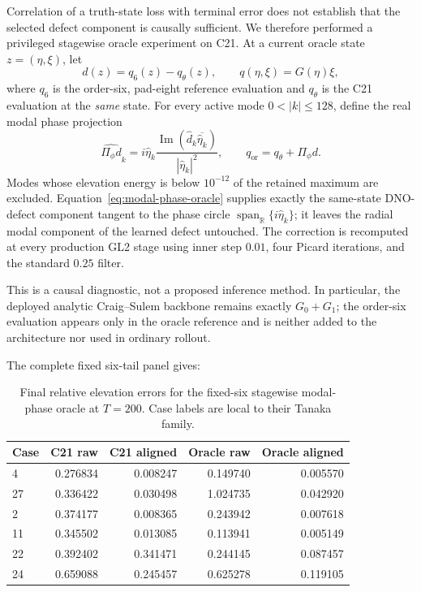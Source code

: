 \documentclass[11pt]{article}
\begin{document}
Correlation of a truth-state loss with terminal error does not establish that
the selected defect component is causally sufficient.  We therefore performed
a privileged stagewise oracle experiment on C21.  At a current oracle state
$z=(\eta,\xi)$, let
\[
  d(z)=q_6(z)-q_\theta(z),
  \qquad
  q(\eta,\xi)=G(\eta)\xi,
\]
where $q_6$ is the order-six, pad-eight reference evaluation and $q_\theta$ is
the C21 evaluation at the \emph{same} state.  For every active mode
$0<|k|\leq128$, define the real modal phase projection
\begin{equation}
  \widehat{\Pi_\phi d}_k
  =
  i\widehat{\eta}_k
  \frac{
    \operatorname{Im}\!\left(
      \widehat d_k\overline{\widehat{\eta}_k}
    \right)
  }{
    |\widehat{\eta}_k|^2
  } ,
  \qquad
  q_{\mathrm{or}}=q_\theta+\Pi_\phi d .
  \label{eq:modal-phase-oracle}
\end{equation}
Modes whose elevation energy is below $10^{-12}$ of the retained maximum are
excluded.  Equation~\eqref{eq:modal-phase-oracle} supplies exactly the
same-state DNO-defect component tangent to the phase circle
$\operatorname{span}_{\mathbb R}\{i\widehat{\eta}_k\}$; it leaves the radial
modal component of the learned defect untouched.  The correction is recomputed
at every production GL2 stage using inner step $0.01$, four Picard iterations,
and the standard $0.25$ filter.

This is a causal diagnostic, not a proposed inference method.  In particular,
the deployed analytic Craig--Sulem backbone remains exactly $G_0+G_1$; the
order-six evaluation appears only in the oracle reference and is neither added
to the architecture nor used in ordinary rollout.

The complete fixed six-tail panel gives:
\begin{table}[htbp]
\centering
\small
\begin{tabular}{lrrrr}
\toprule
Case & C21 raw & C21 aligned & Oracle raw & Oracle aligned \\
\midrule
4 & 0.276834 & 0.008247 & 0.149740 & 0.005570 \\
27 & 0.336422 & 0.030498 & 1.024735 & 0.042920 \\
2 & 0.374177 & 0.008365 & 0.243942 & 0.007618 \\
11 & 0.345502 & 0.013085 & 0.113941 & 0.005149 \\
22 & 0.392402 & 0.341471 & 0.244145 & 0.087457 \\
24 & 0.659088 & 0.245457 & 0.625278 & 0.119105 \\
\bottomrule
\end{tabular}
\caption{Final relative elevation errors for the fixed-six stagewise
modal-phase oracle at $T=200$.  Case labels are local to their Tanaka family.}
\label{tab:modal-phase-oracle-six}
\end{table}
\end{document}

